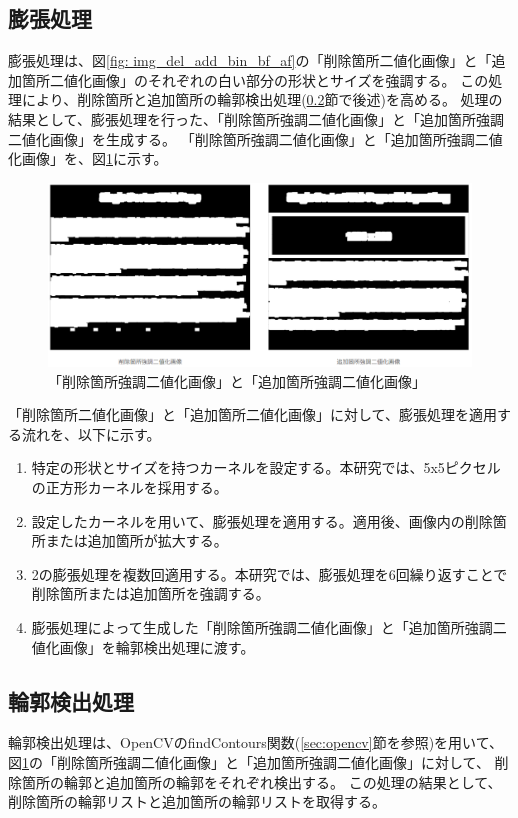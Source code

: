 \subsection{膨張処理}\label{subsec:dilation}
膨張処理は、図\ref{fig: img_del_add_bin_bf_af}の「削除箇所二値化画像」と「追加箇所二値化画像」のそれぞれの白い部分の形状とサイズを強調する。
この処理により、削除箇所と追加箇所の輪郭検出処理(\ref{subsec:contour_detection_processing}節で後述)を高める。
処理の結果として、膨張処理を行った、「削除箇所強調二値化画像」と「追加箇所強調二値化画像」を生成する。
「削除箇所強調二値化画像」と「追加箇所強調二値化画像」を、図\ref{fig: img_del_add_highlight_bin}に示す。
\begin{figure}[tp]
    \begin{center}
        \includegraphics[width=1.0\columnwidth]{image/4_img_del_add_highlight_bin.png}
        \caption{「削除箇所強調二値化画像」と「追加箇所強調二値化画像」}
        \label{fig: img_del_add_highlight_bin}
    \end{center}
\end{figure}
\par
「削除箇所二値化画像」と「追加箇所二値化画像」に対して、膨張処理を適用する流れを、以下に示す。
\begin{enumerate}
    \item 特定の形状とサイズを持つカーネルを設定する。本研究では、5x5ピクセルの正方形カーネルを採用する。
    \item 設定したカーネルを用いて、膨張処理を適用する。適用後、画像内の削除箇所または追加箇所が拡大する。
    \item 2の膨張処理を複数回適用する。本研究では、膨張処理を6回繰り返すことで削除箇所または追加箇所を強調する。
    \item 膨張処理によって生成した「削除箇所強調二値化画像」と「追加箇所強調二値化画像」を輪郭検出処理に渡す。
\end{enumerate}

\subsection{輪郭検出処理}\label{subsec:contour_detection_processing}
輪郭検出処理は、OpenCVのfindContours関数(\ref{sec:opencv}節を参照)を用いて、図\ref{fig: img_del_add_highlight_bin}の「削除箇所強調二値化画像」と「追加箇所強調二値化画像」に対して、
削除箇所の輪郭と追加箇所の輪郭をそれぞれ検出する。
この処理の結果として、削除箇所の輪郭リストと追加箇所の輪郭リストを取得する。

